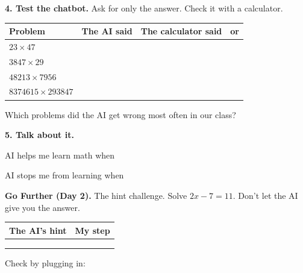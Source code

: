 \documentclass[11pt]{article}
\begin{document}
\newpage

{\large\textbf{4. Test the chatbot.}} Ask for only the answer. Check it with a calculator.

\vspace{0.3em}
\begin{tabular}{|R{1.8in}|R{2.0in}|R{2.0in}|c|}
\hline
\textbf{Problem} & \textbf{The AI said} & \textbf{The calculator said} & \textbf{ or } \\ \hline
$23 \times 47$ & &  & \\[0.4em] \hline
$3847 \times 29$ & &  & \\[0.4em] \hline
$48213 \times 7956$ & &  & \\[0.4em] \hline
$8374615 \times 293847$ & &  & \\[0.4em] \hline
\end{tabular}

\vspace{0.7em}
Which problems did the AI get wrong most often in our class? 

\vspace{1.0em}
{\large\textbf{5. Talk about it.}}

\vspace{0.5em}
AI helps me learn math when 

\vspace{0.7em}
AI stops me from learning when 

\vspace{1.2em}
{\large\textbf{Go Further (Day 2).}} The hint challenge. Solve $2x - 7 = 11$. Don't let the AI give you the answer.

\vspace{0.3em}
\begin{tabular}{|R{3.2in}|R{3.2in}|}
\hline
\textbf{The AI's hint} & \textbf{My step} \\ \hline
{} &  \\[1.0em] \hline
{} &  \\[1.0em] \hline
 & \\[1.0em] \hline
\end{tabular}

\vspace{0.6em}
Check by plugging in: 
\end{document}
